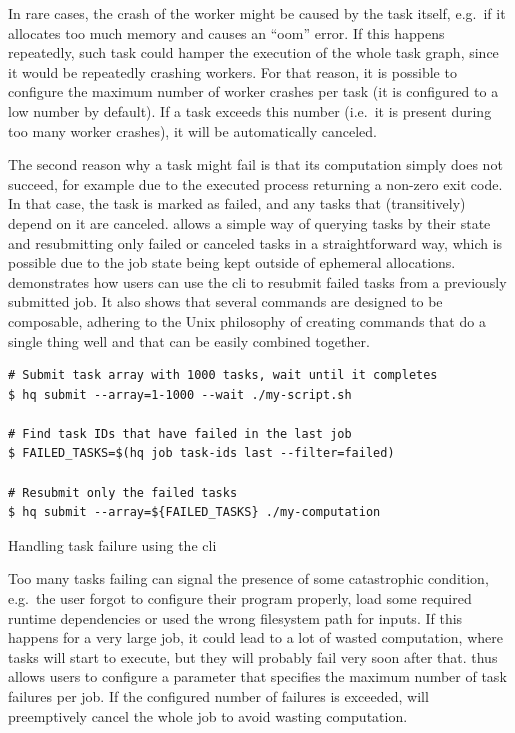In rare cases, the crash of the worker might be caused by the task itself, e.g.\ if it allocates
too much memory and causes an ``\gls{oom}'' error. If this happens repeatedly, such
task could hamper the execution of the whole task graph, since it would be repeatedly crashing
workers. For that reason, it is possible to configure the maximum number of worker crashes per task
(it is configured to a low number by default). If a task exceeds this number (i.e.\ it is present
during too many worker crashes), it will be automatically canceled.

The second reason why a task might fail is that its computation simply does not succeed, for
example due to the executed process returning a non-zero exit code. In that case, the task is
marked as failed, and any tasks that (transitively) depend on it are canceled.
\hyperqueue{} allows a simple way of querying tasks by their state and resubmitting only
failed or canceled tasks in a straightforward way, which is possible due to the job state being
kept outside of ephemeral allocations.~ demonstrates how users can use the
\hq{} \gls{cli} to resubmit failed tasks from a previously
submitted job. It also shows that several \hq{} commands are designed to be
composable, adhering to the Unix philosophy of creating commands that do a single thing well and
that can be easily combined together.

\begin{listing}[h]
	\begin{verbatim}
# Submit task array with 1000 tasks, wait until it completes
$ hq submit --array=1-1000 --wait ./my-script.sh

# Find task IDs that have failed in the last job
$ FAILED_TASKS=$(hq job task-ids last --filter=failed)

# Resubmit only the failed tasks
$ hq submit --array=${FAILED_TASKS} ./my-computation
	\end{verbatim}
	\caption{Handling task failure using the \hyperqueue{} \acrshort{cli}}
	\label{lst:hq-cli-fault-tolerance}
\end{listing}

Too many tasks failing can signal the presence of some catastrophic condition, e.g.\ the user
forgot to configure their program properly, load some required runtime dependencies or used the
wrong filesystem path for inputs. If this happens for a very large job, it could lead to a lot of
wasted computation, where tasks will start to execute, but they will probably fail very soon after
that. \hyperqueue{} thus allows users to configure a parameter that specifies the maximum
number of task failures per job. If the configured number of failures is exceeded,
\hq{} will preemptively cancel the whole job to avoid wasting computation.

